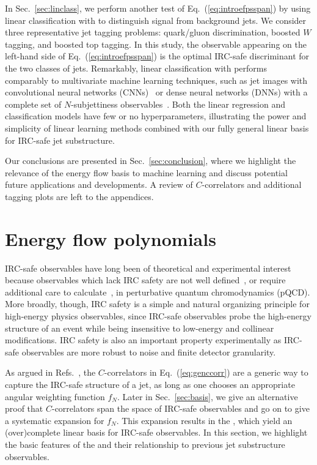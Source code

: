 \documentclass[letterpaper,11pt]{article}
\DeclareRobustCommand{\Sec}[1]{Sec.~\ref{#1}}
\DeclareRobustCommand{\Eq}[1]{Eq.~(\ref{#1})}
\DeclareRobustCommand{\Refs}[1]{Refs.~\cite{#1}}
\newcommand{\Bs}{\text{EFPs}\xspace}
\begin{document}
In \Sec{sec:linclass}, we perform another test of \Eq{eq:introefpsspan} by using linear classification with \Bs to distinguish signal from background jets.
%
We consider three representative jet tagging problems: quark/gluon discrimination, boosted $W$ tagging, and boosted top tagging.
%
In this study, the observable appearing on the left-hand side of \Eq{eq:introefpsspan} is the optimal IRC-safe discriminant for the two classes of jets.
%
Remarkably, linear classification with \Bs performs comparably to multivariate machine learning techniques, such as jet images with convolutional neural networks (CNNs)~\cite{Cogan:2014oua,deOliveira:2015xxd,Barnard:2016qma,Komiske:2016rsd,Kasieczka:2017nvn} or dense neural networks (DNNs) with a complete set of $N$-subjettiness observables~\cite{Datta:2017rhs}.
%
Both the linear regression and classification models have few or no hyperparameters, illustrating the power and simplicity of linear learning methods combined with our fully general linear basis for IRC-safe jet substructure.

Our conclusions are presented in \Sec{sec:conclusion}, where we highlight the relevance of the energy flow basis to machine learning and discuss potential future applications and developments.
%
A review of $C$-correlators and additional tagging plots are left to the appendices.


\section{Energy flow polynomials}
\label{sec:efps}

IRC-safe observables have long been of theoretical and experimental interest because observables which lack IRC safety are not well defined~\cite{Kinoshita:1962ur,Lee:1964is,Weinberg:1995mt,sterman1995handbook}, or require additional care to calculate~\cite{Larkoski:2013paa,Larkoski:2015lea,Waalewijn:2012sv,Chang:2013rca,Elder:2017bkd}, in perturbative quantum chromodynamics (pQCD).
%
More broadly, though, IRC safety is a simple and natural organizing principle for high-energy physics observables, since IRC-safe observables probe the high-energy structure of an event while being insensitive to low-energy and collinear modifications.
%
IRC safety is also an important property experimentally as IRC-safe observables are more robust to noise and finite detector granularity.

As argued in \Refs{Tkachov:1995kk,Sveshnikov:1995vi,Cherzor:1997ak,Tkachov:1999py}, the $C$-correlators in \Eq{eq:genccorr} are a generic way to capture the IRC-safe structure of a jet, as long as one chooses an appropriate angular weighting function $f_N$.
%
Later in \Sec{sec:basis}, we give an alternative proof that $C$-correlators span the space of IRC-safe observables and go on to give a systematic expansion for $f_N$.
%
This expansion results in the \Bs, which yield an (over)complete linear basis for IRC-safe observables.
%
In this section, we highlight the basic features of the \Bs and their relationship to previous jet substructure observables.
\end{document}
